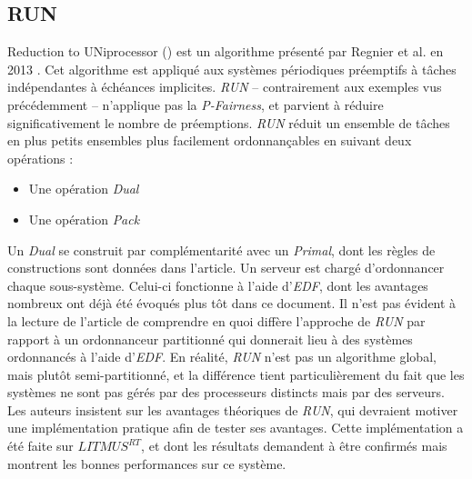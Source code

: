 	\subsection{RUN}\label{RUN}\label{QPS}
	Reduction to UNiprocessor () est un algorithme présenté par Regnier et al. en 2013 \cite{regnier_multiprocessor_2013}. 
	Cet algorithme est appliqué aux systèmes périodiques préemptifs à tâches indépendantes à 
	échéances implicites. \textit{RUN} -- contrairement aux exemples vus précédemment -- n'applique pas 
	la \textit{P-Fairness}, et parvient à réduire significativement le nombre de préemptions. 
	\textit{RUN} réduit un ensemble de tâches en plus petits ensembles plus facilement ordonnançables 
	en suivant deux opérations :\medskip
	\begin{itemize}
		\item Une opération \og \textit{Dual}\fg{} 
		\item Une opération \og \textit{Pack}\fg{} 
	\end{itemize}
	Un \textit{Dual} se construit par complémentarité avec un \textit{Primal}, dont les règles de constructions sont 
	données dans l'article.
	Un serveur est chargé d'ordonnancer chaque sous-système. Celui-ci fonctionne à l'aide 
	d'\textit{EDF}, dont les avantages nombreux ont déjà été évoqués plus tôt dans ce document. 
	Il n'est pas évident à la lecture de l'article de comprendre en quoi 
	diffère l'approche de \textit{RUN} par rapport à un ordonnanceur 
	partitionné qui donnerait lieu à des systèmes ordonnancés à l'aide d'\textit{EDF}. 
	En réalité, \textit{RUN} n'est pas un algorithme global, mais plutôt 
	semi-partitionné, et la différence tient particulièrement du fait que les systèmes ne sont pas 
	gérés par des processeurs distincts mais par des serveurs.  
	Les auteurs insistent sur les avantages théoriques de \textit{RUN}, qui devraient motiver une implémentation 
	pratique afin de tester ses avantages. Cette implémentation a été faite 
	\cite{compagnin_putting_2014} sur $LITMUS^{RT}$, et dont les résultats demandent à 
	être confirmés mais montrent les bonnes performances sur ce système.\newline
	
